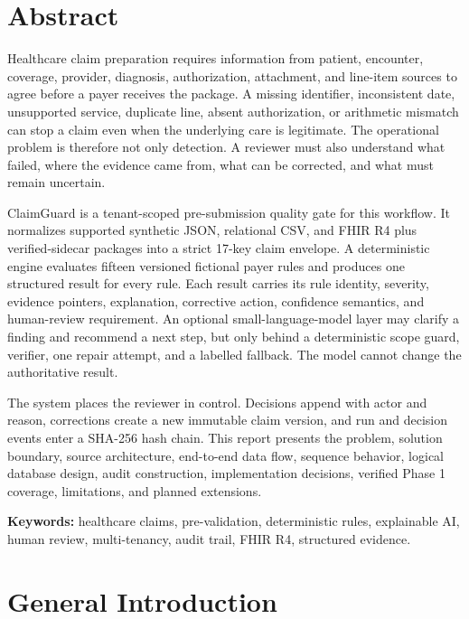 \documentclass[11pt,a4paper,oneside]{report}
\begin{document}

\chapter*{Abstract}
Healthcare claim preparation requires information from patient, encounter, coverage, provider, diagnosis, authorization, attachment, and line-item sources to agree before a payer receives the package. A missing identifier, inconsistent date, unsupported service, duplicate line, absent authorization, or arithmetic mismatch can stop a claim even when the underlying care is legitimate. The operational problem is therefore not only detection. A reviewer must also understand what failed, where the evidence came from, what can be corrected, and what must remain uncertain.

ClaimGuard is a tenant-scoped pre-submission quality gate for this workflow. It normalizes supported synthetic JSON, relational CSV, and FHIR R4 plus verified-sidecar packages into a strict 17-key claim envelope. A deterministic engine evaluates fifteen versioned fictional payer rules and produces one structured result for every rule. Each result carries its rule identity, severity, evidence pointers, explanation, corrective action, confidence semantics, and human-review requirement. An optional small-language-model layer may clarify a finding and recommend a next step, but only behind a deterministic scope guard, verifier, one repair attempt, and a labelled fallback. The model cannot change the authoritative result.

The system places the reviewer in control. Decisions append with actor and reason, corrections create a new immutable claim version, and run and decision events enter a SHA-256 hash chain. This report presents the problem, solution boundary, source architecture, end-to-end data flow, sequence behavior, logical database design, audit construction, implementation decisions, verified Phase 1 coverage, limitations, and planned extensions.

\textbf{Keywords:} healthcare claims, pre-validation, deterministic rules, explainable AI, human review, multi-tenancy, audit trail, FHIR R4, structured evidence.

\clearpage
\tableofcontents
\clearpage
\listoffigures
\clearpage
\listoftables
\clearpage


\chapter{General Introduction}
\end{document}
